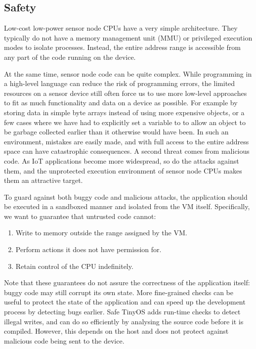 \subsection{Safety}
\label{sec-introduction-safety}
Low-cost low-power sensor node CPUs have a very simple architecture. They typically do not have a memory management unit (MMU) or privileged execution modes to isolate processes. Instead, the entire address range is accessible from any part of the code running on the device.

At the same time, sensor node code can be quite complex. While programming in a high-level language can reduce the risk of programming errors, the limited resources on a sensor device still often force us to use more low-level approaches to fit as much functionality and data on a device as possible. For example by storing data in simple byte arrays instead of using more expensive objects, or a few cases where we have had to explicitly set a variable to  to allow an object to be garbage collected earlier than it otherwise would have been. In such an environment, mistakes are easily made, and with full access to the entire address space can have catastrophic consequences. A second threat comes from malicious code. As IoT applications become more widespread, so do the attacks against them, and the unprotected execution environment of sensor node CPUs makes them an attractive target.

To guard against both buggy code and malicious attacks, the application should be executed in a sandboxed manner and isolated from the VM itself. Specifically, we want to guarantee that untrusted code cannot:
\begin{enumerate}
    \item Write to memory outside the range assigned by the VM.
    \item Perform actions it does not have permission for.
    \item Retain control of the CPU indefinitely.
\end{enumerate}

Note that these guarantees do not assure the correctness of the application itself: buggy code may still corrupt its own state. More fine-grained checks can be useful to protect the state of the application and can speed up the development process by detecting bugs earlier. Safe TinyOS \cite{Cooprider:2007ub} adds run-time checks to detect illegal writes, and can do so efficiently by analysing the source code before it is compiled. However, this depends on the host and does not protect against malicious code being sent to the device.

